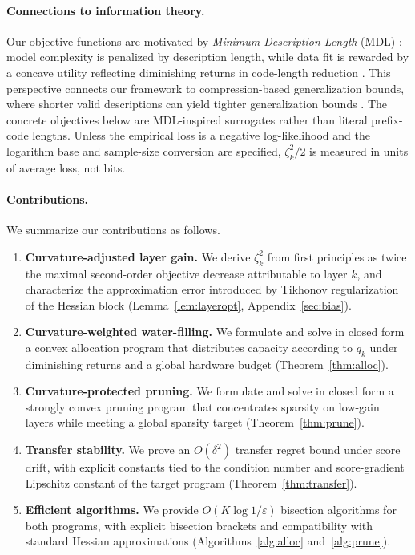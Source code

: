 \documentclass[accepted]{uai2026}%
\theoremstyle{remark}%
\begin{document}
\paragraph{Connections to information theory.}
Our objective functions are motivated by \textit{Minimum Description Length}
(MDL) \citep{Rissanen1978Modeling, Rissanen1989StochasticCI}: model complexity is penalized by description length, while
data fit is rewarded by a concave utility reflecting diminishing returns
in code-length reduction \citep{Lotfi2023NonVacuousGB}.
This perspective connects our framework to compression-based
generalization bounds, where shorter valid descriptions can yield tighter
generalization bounds \citep{wilson2025position, SCHMIDHUBER1997857}.
The concrete objectives below are MDL-inspired surrogates rather than
literal prefix-code lengths. Unless the empirical loss is a negative
log-likelihood and the logarithm base and sample-size conversion are specified,
$\zeta_k^2/2$ is measured in units of average loss, not bits.

\paragraph{Contributions.}
We summarize our contributions as follows.
\vspace{-2mm}
\begin{enumerate}[noitemsep]
  \item \textbf{Curvature-adjusted layer gain.}
    We derive $\zeta_k^{2}$ from first principles as twice the
    maximal second-order objective decrease attributable to layer $k$,
    and characterize the approximation error introduced by Tikhonov
    regularization of the Hessian block
    (Lemma~\ref{lem:layeropt}, Appendix~\ref{sec:bias}).

  \item \textbf{Curvature-weighted water-filling.}
    We formulate and solve in closed form a convex allocation program
    that distributes capacity according to $q_k$ under diminishing
    returns and a global hardware budget
    (Theorem~\ref{thm:alloc}).

  \item \textbf{Curvature-protected pruning.}
    We formulate and solve in closed form a strongly convex pruning
    program that concentrates sparsity on low-gain layers while
    meeting a global sparsity target
    (Theorem~\ref{thm:prune}).

  \item \textbf{Transfer stability.}
    We prove an $O(\delta^2)$ transfer regret bound under score drift,
    with explicit constants tied to the condition number and
    score-gradient Lipschitz constant of the target program
    (Theorem~\ref{thm:transfer}).

  \item \textbf{Efficient algorithms.}
    We provide $O(K\log 1/\varepsilon)$ bisection algorithms for both
    programs, with explicit bisection brackets and compatibility with
    standard Hessian approximations
    (Algorithms~\ref{alg:alloc} and~\ref{alg:prune}).
\end{enumerate}
\end{document}
